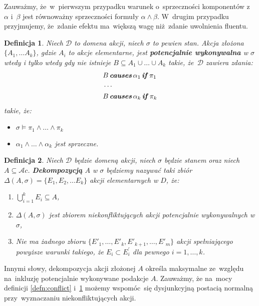 \documentclass[11pt,a4paper]{article}
\newtheorem{defn}{Definicja}
\DeclareMathOperator{\Causes}{\textbf{\textit{causes}}}
\DeclareMathOperator{\If}{\textbf{\textit{if}}}
\begin{document}
Zauważmy, że~w~pierwszym przypadku warunek o~sprzeczności komponentów z~$\alpha$ i~$\beta$ jest równoważny sprzeczności formuły $\alpha \land \beta$.
W~drugim przypadku przyjmujemy, że~zdanie efektu ma~większą wagę niż~zdanie uwolnienia fluentu. %

\begin{defn}
    \label{defn:potentially-executable}
    Niech $\mathcal{D}$ to domena akcji, niech $\sigma$ to pewien stan. Akcja złożona $\{ A_1, \dots A_k \}$, gdzie $A_i$ to akcje elementarne, jest \textbf{potencjalnie wykonywalna} w $\sigma$ wtedy i tylko wtedy gdy nie istnieje $B \subseteq A_1 \cup \dots \cup A_k$ takie, że~$\mathcal{D}$ zawiera zdania:
    \begin{align*}
        & B \Causes \alpha_1 \If \pi_1 \\
        & \cdots \\
        & B \Causes \alpha_k \If \pi_k
    \end{align*}
    takie, że:
    \begin{itemize}
        \item $\sigma \models \pi_1 \land \dots \land \pi_k$
        \item $\alpha_1 \land \dots \land \alpha_k$ jest sprzeczne.
    \end{itemize}
\end{defn}

\begin{defn}
    Niech $\mathcal{D}$ będzie domeną akcji, niech $\sigma$ będzie stanem oraz niech $A \subseteq \mathcal{A}c$.
    \textbf{Dekompozycją} $A$ w $\sigma$ będziemy nazywać taki zbiór $\Delta(A, \sigma) = \{ E_1, E_2, \dots E_k \}$ akcji elementarnych w $D$, że:
    \begin{enumerate}
        \item $\bigcup_{i = 1}^{k} E_i \subseteq A$,
        \item $\Delta(A, \sigma)$ jest zbiorem niekonfliktujących akcji potencjalnie wykonywalnych w  $\sigma$,
        \item Nie ma żadnego zbioru $\{ E'_1, \dots, E'_k, E'_{k+1}, \dots, E'_m \}$ akcji spełniającego powyższe warunki takiego, że $E_i \subset E_i^\prime$ dla pewnego $i = 1, \dots, k$.
    \end{enumerate}
\end{defn}

Innymi słowy, dekompozycja akcji złożonej $A$ określa maksymalne ze~względu na~inkluzję potencjalnie wykonywane podakcje $A$.
Zauważmy, że na~mocy definicji \ref{defn:conflict} i~\ref{defn:potentially-executable} możemy wspomóc~się dysjunkcyjną postacią normalną przy~wyznaczaniu niekonfliktujących akcji.
    
\end{document}
